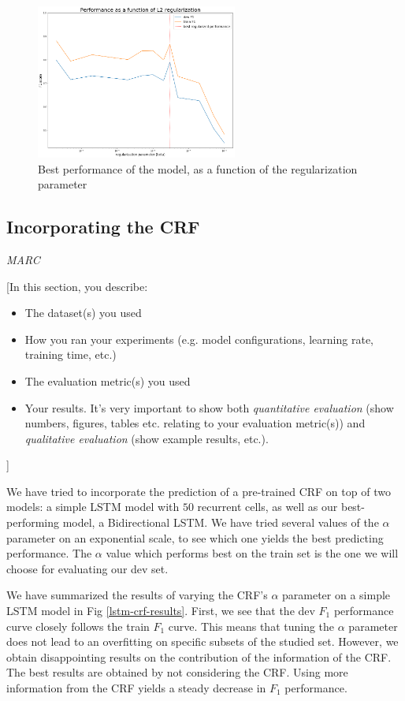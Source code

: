 \documentclass{article} %
\begin{document}
\begin{figure}[h]
\begin{center}
\includegraphics[width=250px]{figs/l2_graph.png}
\caption{Best performance of the model, as a function of the regularization parameter}
\label{l2_graph}
\end{center}
\end{figure}

\subsection{Incorporating the CRF}
\textit{MARC}

[In this section, you describe:
\begin{itemize}
\item The dataset(s) you used
\item How you ran your experiments (e.g. model configurations, learning rate, training time, etc.)
\item The evaluation metric(s) you used
\item Your results. It's very important to show both \textit{quantitative evaluation} (show numbers, figures, tables etc. relating to your evaluation metric(s)) and \textit{qualitative evaluation} (show example results, etc.).
\end{itemize}]

We have tried to incorporate the prediction of a pre-trained CRF on top of two models: a simple LSTM model with $50$ recurrent cells, as well as our best-performing model, a Bidirectional LSTM. We have tried several values of the $\alpha$ parameter on an exponential scale, to see which one yields the best predicting performance. The $\alpha$ value which performs best on the train set is the one we will choose for evaluating our dev set.

We have summarized the results of varying the CRF's $\alpha$ parameter on a simple LSTM model in Fig \ref{lstm-crf-results}. First, we see that the dev $F_1$ performance curve closely follows the  train $F_1$ curve. This means that tuning the $\alpha$ parameter does not lead to an overfitting on specific subsets of the studied set. However, we obtain disappointing results on the contribution of the information of the CRF. The best results are obtained by not considering the CRF. Using more information from the CRF yields a steady decrease in $F_1$ performance.
\end{document}
